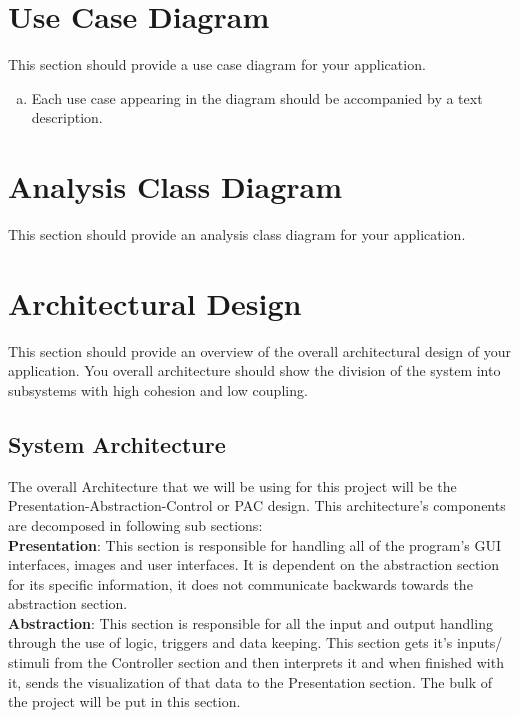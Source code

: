 \documentclass[]{article}
\begin{document}


\section{Use Case Diagram}
\label{sec:use_case_diagram}
This section should provide a use case diagram for your application. 
\begin{enumerate}[a)]
	\item Each use case appearing in the diagram should be accompanied by a text description. 
\end{enumerate}

\section{Analysis Class Diagram}
\label{sec:analysis_class_diagram}
This section should provide an analysis class diagram for your application.


\section{Architectural Design}
\label{sec:architectural_design}
This section should provide an overview of the overall architectural design of
your application. You overall architecture should show the division of the system
into subsystems with high cohesion and low coupling.

\subsection{System Architecture}
\label{sub:system_architecture}

The overall Architecture that we will be using for this project will be the 
Presentation-Abstraction-Control or PAC design. This architecture’s components 
are decomposed in following sub sections: \\

\textbf{Presentation}: This section is responsible for handling all of the program’s
GUI interfaces, images and user interfaces. It is dependent on the abstraction section
for its specific information, it does not communicate backwards towards the abstraction section. \\

\textbf{Abstraction}: This section is responsible for all the input and output
handling through the use of logic, triggers and data keeping. This section gets it’s
inputs/ stimuli from the Controller section and then interprets it and when finished
with it, sends the visualization of that data to the Presentation section. The bulk
of the project will be put in this section. \\
\end{document}
